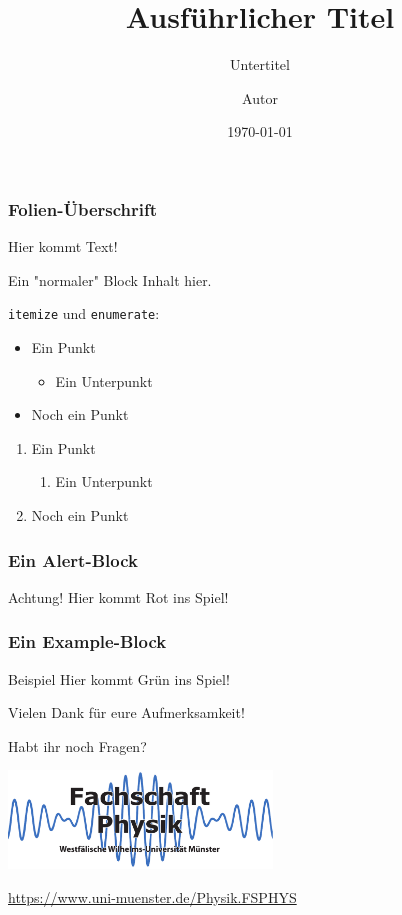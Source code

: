 \documentclass[german, ngerman]{beamer}
\title[Kurzer Titel]{Ausführlicher Titel}
\subtitle{Untertitel}
\author{Autor}
\institute{Fachschaft Physik}
\date{\today}
\begin{document}
\begin{frame}[plain]
	\titlepage
\end{frame}

\begin{frame}
	\frametitle{Folien-Überschrift}

	Hier kommt Text!

	\begin{block}{Ein "normaler" Block}
		Inhalt hier.
	\end{block}

	\texttt{itemize} und \texttt{enumerate}:
	\begin{itemize}
		\item Ein Punkt
		\begin{itemize}
			\item Ein Unterpunkt
		\end{itemize}
		\item Noch ein Punkt
	\end{itemize}
	\begin{enumerate}
		\item Ein Punkt
		\begin{enumerate}
			\item Ein Unterpunkt
		\end{enumerate}
		\item Noch ein Punkt
	\end{enumerate}
\end{frame}

\begin{frame}
	\frametitle{Ein Alert-Block}

	\begin{alertblock}{Achtung!}
		Hier kommt Rot ins Spiel!
	\end{alertblock}
\end{frame}

\begin{frame}
	\frametitle{Ein Example-Block}

	\begin{exampleblock}{Beispiel}
		Hier kommt Grün ins Spiel!
	\end{exampleblock}
\end{frame}

\begin{frame}
	\begin{block}{}
		\centering
		Vielen Dank für eure Aufmerksamkeit!
	\end{block}

	\begin{block}{}
		\centering
		Habt ihr noch Fragen?
	\end{block}

	\begin{center}
		\includegraphics[width=7cm]{fsphys-logo.pdf}

		\medskip
		\url{https://www.uni-muenster.de/Physik.FSPHYS}
	\end{center}
\end{frame}
\end{document}
